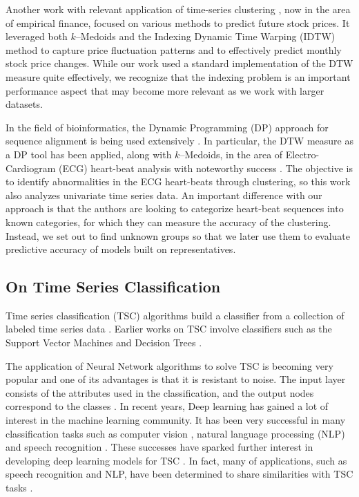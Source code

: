 Another work with relevant application of time-series clustering \cite{Nakagawa2019}, now in the area of empirical finance, focused on various methods to predict future stock prices. It leveraged both $k$--Medoids and the Indexing Dynamic Time Warping (IDTW) method to capture price fluctuation patterns and to effectively predict monthly stock price changes. While our work used a standard implementation of the DTW measure quite effectively, we recognize that the indexing problem is an important performance aspect that may become more relevant as we work with larger datasets.

In the field of bioinformatics, the Dynamic Programming (DP) approach for sequence alignment is being used extensively \cite{Dinov2016}. In particular, the DTW measure as a DP tool has been applied, along with $k$--Medoids, in the area of Electro-Cardiogram (ECG) heart-beat analysis with noteworthy success \cite{Annam2011}. The objective is to identify abnormalities in the ECG heart-beats through clustering, so this work also analyzes univariate time series data. An important difference with our approach is that the authors are looking to categorize heart-beat sequences into known categories, for which they can measure the accuracy of the clustering. Instead, we set out to find unknown groups so that we later use them to evaluate predictive accuracy of models built on representatives.

\subsection{On Time Series Classification}

Time series classification (TSC) algorithms build a classifier from a collection of labeled time series data \cite{Bagnall2017a}. Earlier works on TSC involve classifiers such as the Support Vector Machines \cite{Kampouraki2008, Mitsa2010} and Decision Trees \cite{Douzal2012, Mitsa2010}. 

The application of Neural Network algorithms to solve TSC is becoming very popular and one of its advantages is that it is resistant to noise. The input layer consists of the attributes used in the classification, and the output nodes correspond to the classes \cite{Mitsa2010}. In recent years, Deep learning \cite{Charniak2019, Goodfellow2016} has gained a lot of interest in the machine learning community. It has been very successful in many classification tasks such as computer vision \cite{Krizhevsky2017}, natural language processing (NLP) \cite{Bahdanau2015} and speech recognition \cite{Hinton2012}. These successes have sparked further interest in developing deep learning models for TSC \cite{Wang2017, Fawaz2019}. In fact, many of applications, such as speech recognition and NLP, have been determined to share similarities with TSC tasks \cite{Fawaz2019}.

